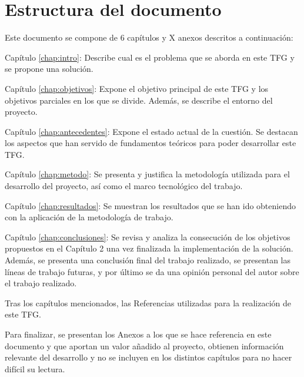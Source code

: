 \section{Estructura del documento}

Este documento se compone de 6 capítulos y X anexos descritos a continuación:

\begin{definitionlist}
\item[Capítulo \ref{chap:intro}: \nameref{chap:intro}] Describe cual es el problema que se aborda en este \acs{TFG} y se propone una solución.
\item[Capítulo \ref{chap:objetivos}: \nameref{chap:objetivos}] Expone el objetivo principal de este \acs{TFG} y los objetivos parciales en los que se divide. Además, se describe el entorno del proyecto.
\item[Capítulo \ref{chap:antecedentes}: \nameref{chap:antecedentes}] Expone el estado actual de la cuestión. Se destacan los aspectos que han servido de fundamentos teóricos  para  poder  desarrollar  este  TFG.
\item[Capítulo \ref{chap:metodo}: \nameref{chap:metodo}] Se  presenta  y  justifica  la 
metodología utilizada para el desarrollo del proyecto, así como el marco tecnológico del 
trabajo.
\item[Capítulo \ref{chap:resultados}: \nameref{chap:resultados}] Se  muestran  los  resultados  que  se  han  ido  obteniendo  con  la aplicación  de  la  metodología  de  trabajo.
\item[Capítulo \ref{chap:conclusiones}: \nameref{chap:conclusiones}] Se  revisa  y analiza  la consecución  de  los  objetivos  propuestos  en  el  Capítulo  2  una  vez  finalizada  la implementación  de  la solución. Además, se  presenta  una  conclusión  final  del trabajo realizado,  se  presentan las  líneas  de  trabajo  futuras,  y  por  último se da  una  opinión personal del autor sobre el trabajo realizado.
\end{definitionlist}

Tras  los  capítulos  mencionados, las Referencias utilizadas para  la  realización  de este TFG.

Para finalizar, se presentan los Anexos a los que se hace referencia en este documento
y que aportan un valor añadido al proyecto, obtienen información relevante del desarrollo 
y no se incluyen en los distintos capítulos para no hacer difícil su lectura.

